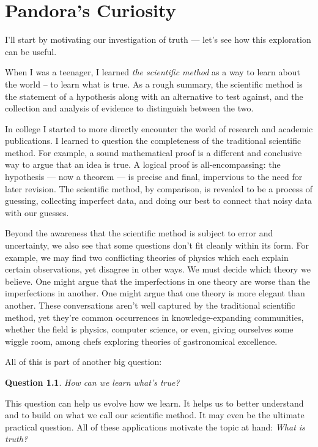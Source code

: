 \documentclass[9pt, twoside]{book}
\newtheorem*{question*}{Question}
\theoremstyle{argtstyle}
\begin{document}
\chapter{Pandora's Curiosity}

I'll start by motivating our investigation of truth ---
let's see how this exploration can be useful.

When I was a teenager, I learned {\em the scientific method} as a way to
learn about the world -- to learn what is true.
As a rough summary,
the scientific method is the statement
of a hypothesis along with an alternative to test against, and
the collection and analysis of evidence to distinguish between
the two.

In college
I started to more directly encounter the world of research
and academic publications.
I learned to question the completeness of the traditional scientific method.
For example, a sound mathematical proof is a different and
conclusive way
to argue that an idea is true.
A logical proof is all-encompassing: the hypothesis --- now a theorem
--- is
precise and final,
impervious to the need for later revision.
The scientific method, by comparison, is revealed to be
a process of guessing, collecting imperfect data, and doing our best to
connect that noisy data with our guesses.

Beyond the awareness that the scientific method is subject to
error and uncertainty, we also
see that some questions don't fit cleanly within its form.
For example, we may find two conflicting theories of physics which
each explain certain observations, yet disagree in other ways. We must decide
which theory we believe. One might argue that the imperfections in one theory are worse
than the imperfections in another. One might argue that one theory is more elegant than
another.
These conversations aren't well captured by the traditional
scientific method, yet
they're common occurrences in knowledge-expanding communities,
whether the field is physics, computer science, or even, giving
ourselves some wiggle room, among chefs exploring theories of gastronomical
excellence.

All of this is part of another big question:

\begin{question*}\label{q2}
    How can we learn what's true?
\end{question*}

This question can help us evolve how we learn.
It helps us to better understand and to build on what we call our
scientific method.
It may even
be the ultimate practical question.
All of these applications motivate
the topic at hand: {\em What is truth?}
\end{document}
